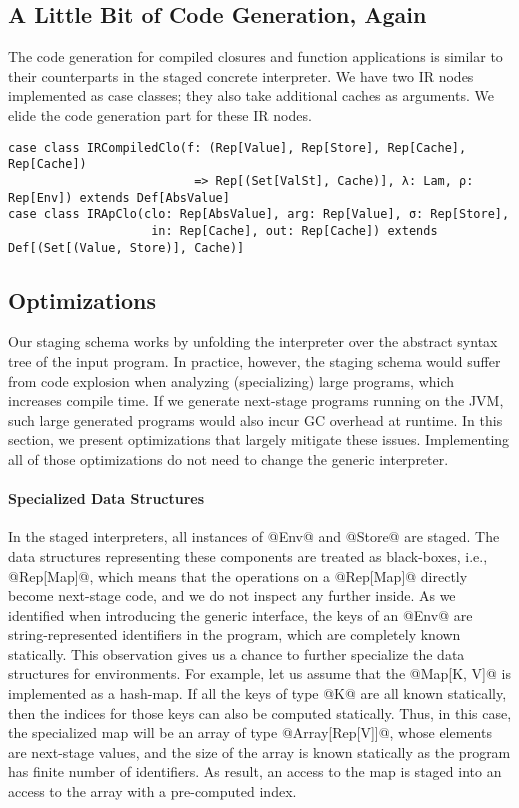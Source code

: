 \subsection{A Little Bit of Code Generation, Again}
The code generation for compiled closures and function applications is similar
to their counterparts in the staged concrete interpreter. We have two IR nodes
implemented as case classes; they also take additional caches as arguments. We
elide the code generation part for these IR nodes.
\begin{lstlisting}
case class IRCompiledClo(f: (Rep[Value], Rep[Store], Rep[Cache], Rep[Cache])
                          => Rep[(Set[ValSt], Cache)], λ: Lam, ρ: Rep[Env]) extends Def[AbsValue]
case class IRApClo(clo: Rep[AbsValue], arg: Rep[Value], σ: Rep[Store],
                    in: Rep[Cache], out: Rep[Cache]) extends Def[(Set[(Value, Store)], Cache)]
\end{lstlisting}

\subsection{Optimizations} \label{staged_ds}

Our staging schema works by unfolding the interpreter over the abstract syntax
tree of the input program. In practice, however, the staging schema would
suffer from code explosion when analyzing (specializing) large programs, which
increases compile time. If we generate next-stage programs running on the JVM,
such large generated programs would also incur GC overhead at runtime. In this
section, we present optimizations that largely mitigate these issues.
Implementing all of those optimizations do not need to change the generic
interpreter.

\paragraph{Specialized Data Structures}

In the staged interpreters, all instances of @Env@ and @Store@ are staged. The
data structures representing these components are treated as black-boxes, i.e.,
@Rep[Map]@, which means that the operations on a @Rep[Map]@ directly become
next-stage code, and we do not inspect any further inside. As we identified when
introducing the generic interface, the keys of an @Env@ are string-represented
identifiers in the program, which are completely known statically. This
observation gives us a chance to further specialize the data structures for environments.
For example, let us assume that the @Map[K, V]@ is implemented as a hash-map.
If all the keys of type @K@ are all known statically, then the indices for
those keys can also be computed statically. Thus, in this case, the specialized
map will be an array of type @Array[Rep[V]]@, whose elements are next-stage
values, and the size of the array is known statically as the program has finite
number of identifiers. As result, an access to the map is staged into an access
to the array with a pre-computed index.

